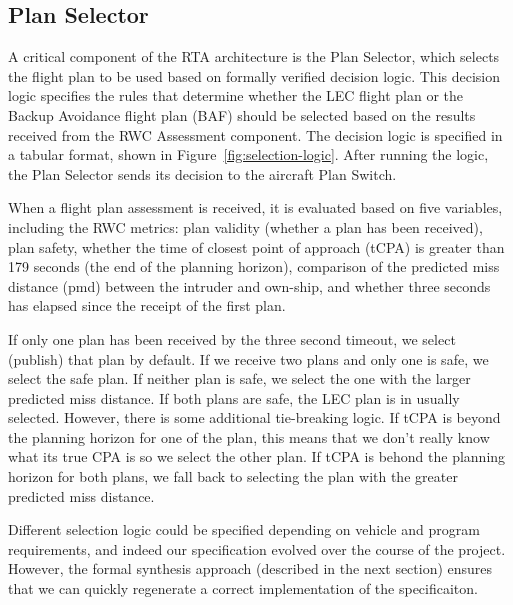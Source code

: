 \subsection{Plan Selector}




A critical component of the RTA architecture is the Plan Selector, which selects the flight
plan to be used based on formally verified decision logic. This decision logic specifies the rules
that determine whether the LEC flight plan or the Backup Avoidance flight plan (BAF) should
be selected based on the results received from the RWC Assessment component. The
decision logic is specified in a tabular format, shown in Figure~\ref{fig:selection-logic}.
After running the logic, the Plan Selector sends its decision to the
aircraft Plan Switch.

When a flight plan assessment is received, it is evaluated based on five
variables, including the RWC metrics:  plan validity (whether a plan has been received), plan
safety, whether the time of closest point of approach (tCPA) is greater than
179 seconds (the end of the planning horizon), comparison of the predicted miss
distance (pmd) between the intruder and own-ship, and whether three seconds has elapsed since the
receipt of the first plan.

If only one plan has been received by the three second timeout, we select (publish)
that plan by default.
If we receive two plans and only one is safe, we select the safe plan.
If neither plan is safe, we select the one with the larger predicted miss distance.
If both plans are safe, the LEC plan is in usually selected.  However, there is some
additional tie-breaking logic.
If tCPA is beyond the planning horizon for one of the plan, this means that we don't really know what
its true CPA is so we select the other plan.
If tCPA is behond the planning horizon for both plans, we fall back to selecting the plan with
the greater predicted miss distance.

Different selection logic could be specified depending on vehicle and program requirements,
and indeed our specification evolved over the course of the project.  However, the
formal synthesis approach (described in the next section) ensures that we can
quickly regenerate a correct implementation of the specificaiton.


